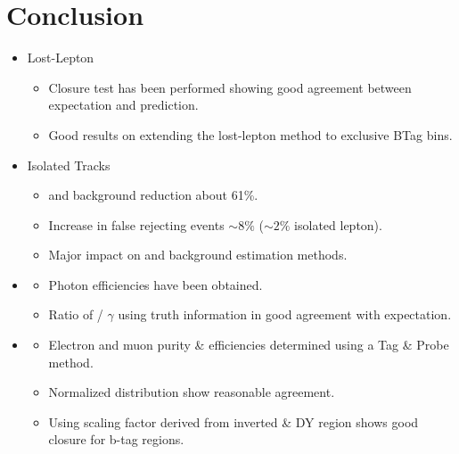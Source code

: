 \documentclass{beamer}
\begin{document}
\section{Conclusion}
\begin{frame}

\begin{itemize}
 \item Lost-Lepton
 \begin{itemize}
  \item Closure test has been performed showing good agreement between expectation and prediction.
  \item Good results on extending the lost-lepton method to exclusive BTag bins.
 \end{itemize}
 \item Isolated Tracks
 \begin{itemize}
  \item \ttbar and \wpj background reduction about 61\%.
  \item Increase in false rejecting events $\sim8\%$ ($\sim2\%$ isolated lepton).
  \item Major impact on \ttbar and \wpj background estimation methods.
 \end{itemize}
  \item \photonJets
 \begin{itemize}
  \item Photon efficiencies have been obtained.
  \item Ratio of \ZInv / $\gamma$ using truth information in good agreement with expectation.
 \end{itemize}
 \item \Zll
 \begin{itemize}
  \item Electron and muon purity \& efficiencies determined using a Tag \& Probe method.
  \item Normalized \met distribution show reasonable agreement.
  \item Using scaling factor derived from inverted \met\& \HT DY region shows good closure for b-tag regions.
 \end{itemize}

 
\end{itemize}


\end{frame}
\end{document}
